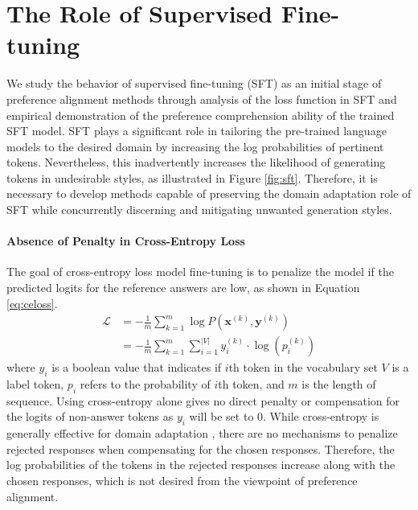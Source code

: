 \section{The Role of Supervised Fine-tuning}\label{sec:role}
We study the behavior of supervised fine-tuning (SFT) as an initial stage of preference alignment methods \citep{ziegler2020finetuning, rafailov2023direct} through analysis of the loss function in SFT and empirical demonstration of the preference comprehension ability of the trained SFT model. SFT plays a significant role in tailoring the pre-trained language models to the desired domain \citep{zhou2023lima,dong2024abilities} by increasing the log probabilities of pertinent tokens. Nevertheless, this inadvertently increases the likelihood of generating tokens in undesirable styles, as illustrated in Figure \ref{fig:sft}. Therefore, it is necessary to develop methods capable of preserving the domain adaptation role of SFT while concurrently discerning and mitigating unwanted generation styles.

\paragraph{Absence of Penalty in Cross-Entropy Loss} The goal of cross-entropy loss model fine-tuning is to penalize the model if the predicted logits for the reference answers are low, as shown in Equation \ref{eq:celoss}. 
\begin{align}
\mathcal{L} &= -\frac{1}{m} \sum_{k=1}^{m} \log P(\mathbf{x}^{(k)}, \mathbf{y}^{(k)})\\
&= -\frac{1}{m}\sum_{k=1}^{m}\sum_{i=1}^{|V|}y_i^{(k)} \cdot \log(p_i^{(k)})\label{eq:celoss}
\end{align}
where $y_i$ is a boolean value that indicates if $i$th token in the vocabulary set $V$ is a label token, $p_i$ refers to the probability of $i$th token, and $m$ is the length of sequence. Using cross-entropy alone gives no direct penalty or compensation for the logits of non-answer tokens \citep{lin2017focal} as  $y_i$ will be set to 0. While cross-entropy is generally effective for domain adaptation  \citep{mao2023crossentropy}, there are no mechanisms to penalize rejected responses when compensating for the chosen responses. Therefore, the log probabilities of the tokens in the rejected responses increase along with the chosen responses, which is not desired from the viewpoint of preference alignment.

